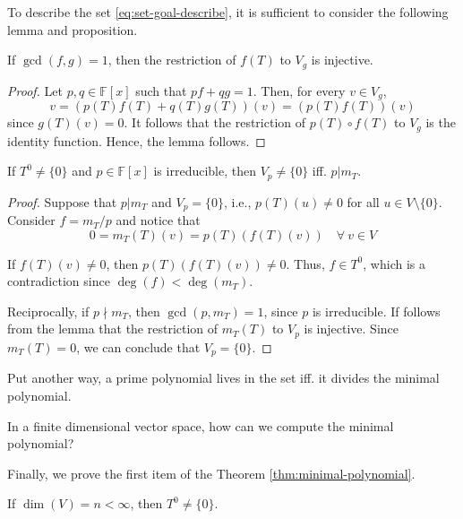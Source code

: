 To describe the set \eqref{eq:set-goal-describe}, it is sufficient to consider the following lemma and proposition.

\begin{lemma}
	If $\gcd(f,g) = 1$, then the restriction of $f(T)$ to $V_g$ is injective.
\end{lemma}

\begin{proof}
	Let $p, q \in \mathbb{F}[x]$ such that $pf + qg = 1$. Then, for every $v \in V_g$,
	\[
		v = (p(T)f(T) + q(T) g(T))(v) = (p(T)f(T))(v)
	\]
	since $g(T)(v) = 0$. It follows that the restriction of $p(T) \circ f(T)$ to $V_g$ is the identity function. Hence, the lemma follows.
\end{proof}

\begin{proposition}
	If $T^0 \neq \{ 0 \}$ and $p \in \mathbb{F}[x]$ is irreducible, then $V_p \neq \{ 0 \}$ iff. $p | m_T$.
\end{proposition}

\begin{proof}
	Suppose that $p | m_T$ and $V_p = \{ 0 \}$, i.e., $p(T)(u) \neq 0$ for all $u \in V \setminus \{ 0 \}$. Consider $f = m_T / p$ and notice that
	\[
		0 = m_T(T)(v) = p(T)(f(T)(v)) \quad \forall~v \in V
	\]
	
	If $f(T)(v) \neq 0$, then $p(T)(f(T)(v)) \neq 0$. Thus, $f \in T^0$, which is a contradiction since $\deg(f) < \deg(m_T)$.
	
	Reciprocally, if $p \nmid m_T$, then $\gcd(p, m_T) = 1$, since $p$ is irreducible. If follows from the lemma that the restriction of $m_T(T)$ to $V_p$ is injective. Since $m_T(T) = 0$, we can conclude that $V_p = \{ 0 \}$. 
\end{proof}

Put another way, a prime polynomial lives in the set iff. it divides the minimal polynomial.

In a finite dimensional vector space, how can we compute the minimal polynomial?

Finally, we prove the first item of the Theorem \ref{thm:minimal-polynomial}.

\begin{theorem}
	If $\dim(V) = n < \infty$, then $T^0 \neq \{ 0 \}$.
\end{theorem}

